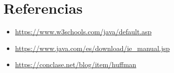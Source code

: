 \documentclass{article}
\begin{document}
	
  \newpage
  \section{Referencias}
  \begin{itemize}
    \item \url{https://www.w3schools.com/java/default.asp}
    \item \url{https://www.java.com/es/download/ie_manual.jsp}
    \item \url{https://conclase.net/blog/item/huffman}
  \end{itemize}

%
%
%
			
\end{document}
